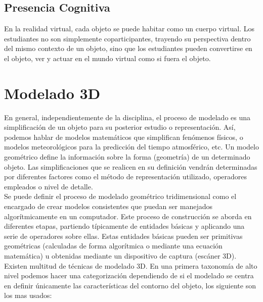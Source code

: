 \subsection{Presencia Cognitiva}
En la realidad virtual, cada objeto se puede habitar como un cuerpo virtual. Los estudiantes no son simplemente coparticipantes, trayendo su perspectiva dentro del mismo contexto de un objeto, 
sino que los estudiantes pueden convertirse en el objeto, ver y actuar en el mundo virtual como si fuera el objeto. \cite{bricken1990learning}

\section{Modelado 3D}\label{mod3d}
En general, independientemente de la disciplina, el proceso de modelado es una simplificación de un objeto para su posterior estudio o representación. 
Así, podemos hablar de modelos matemáticos que simplifican fenómenos físicos, o modelos meteorológicos para la predicción del tiempo atmosférico, etc.
 Un modelo geométrico define la información sobre la forma (geometría) de un determinado objeto. Las simplificaciones que se realicen en su definición 
 vendrán determinadas por diferentes factores como el método de representación utilizado, operadores empleados o nivel de detalle.\cite{web13} \\
Se puede definir el proceso de modelado geométrico tridimensional como el encargado de crear modelos consistentes que puedan ser manejados algorítmicamente 
en un computador. Este proceso de construcción se aborda en diferentes etapas, partiendo típicamente de entidades básicas y aplicando una serie de operadores 
sobre ellas. Estas entidades básicas pueden ser primitivas geométricas (calculadas de forma algorítmica o mediante una ecuación matemática) u obtenidas mediante 
un dispositivo de captura (escáner 3D).\\
Existen multitud de técnicas de modelado 3D. En una primera taxonomía de alto nivel podemos hacer una categorización dependiendo de si el modelado se centra 
en definir únicamente las características del contorno del objeto, los siguiente son los mas usados:\\
